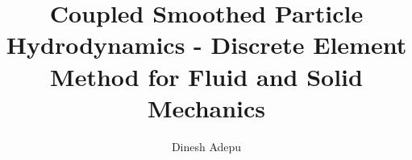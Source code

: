 \documentclass[tikz, twoside]{iitbreport}
\newcounter{question}
\begin{document}
\newcommand\Que[1]{%
   \leavevmode\par
   \stepcounter{question}
   \noindent
   \thequestion. Q --- #1\par}

\newcommand\Ans[2][]{%
    \leavevmode\par\noindent
   {\leftskip37pt
    A --- \textbf{#1}#2\par}}

\setcounter{page}{1}

\title{Coupled Smoothed Particle Hydrodynamics - Discrete Element Method
  for Fluid and Solid Mechanics}
\author{Dinesh Adepu}












\maketitle

\end{document}
